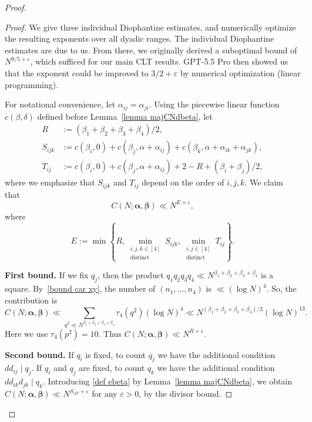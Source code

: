 \documentclass[reqno, 12pt]{amsart}
\theoremstyle{plain}
\theoremstyle{definition}
\theoremstyle{remark}
\newcommand{\bfbeta}{\boldsymbol{\beta}}
\newcommand{\bfalpha}{\boldsymbol{\alpha}}
\begin{document}
\begin{proof}
\begin{proof}
We give three individual Diophantine estimates,
and numerically optimize the resulting exponents over all dyadic ranges.
The individual Diophantine estimates are due to us.
From there, we originally derived a suboptimal bound of $N^{9/5+\varepsilon}$, which sufficed for our main CLT results.
GPT-5.5 Pro then showed us that the exponent could be improved to $3/2+\varepsilon$ by numerical optimization (linear programming).

For notational convenience, let $\alpha_{ij}=\alpha_{ji}$.
Using the piecewise linear function $c(\beta,\delta)$ defined before
Lemma~\ref{lemma majCNdbeta}, let
\begin{align}
R &:= (\beta_1+\beta_2+\beta_3+\beta_4)/2, \\
S_{ijk} &:=
c(\beta_i,0)
+ c(\beta_j,\alpha+\alpha_{ij})
+ c(\beta_k,\alpha+\alpha_{ik}+\alpha_{jk}),
\label{def ebeta} \\
T_{ij} &:=
c(\beta_i,0)
+ c(\beta_j,\alpha+\alpha_{ij})
+ 2-R+(\beta_i+\beta_j)/2,
\end{align}
where we emphasize that $S_{ijk}$ and $T_{ij}$ depend on the order of $i,j,k$.
We claim that
\begin{equation}
C(N;\bfalpha,\bfbeta)\ll N^{E+\varepsilon},
\end{equation}
where
\begin{equation}
E := \min\left\{R,
\min_{\substack{i,j,k\in [4]\\ \mathrm{distinct}}} S_{ijk},
\min_{\substack{i,j\in [4]\\ \mathrm{distinct}}} T_{ij}
\right\}.
\end{equation}

\textbf{First bound.}
If we fix  $q_j$, then the product $q_1q_2q_3q_4\ll N^{\beta_1+\beta_2+\beta_3+\beta_4}$ is a square. By~\eqref{bound car xy}, the number of $(n_1,\ldots,n_4)$ is $\ll (\log N)^4$. So, the contribution is
$$C(N;\bfalpha,\bfbeta)\ll\sum_{q^2\ll N^{\beta_1+\beta_2+\beta_3+\beta_4}}\tau_4(q^2)(\log N)^4
\ll N^{(\beta_1+\beta_2+\beta_3+\beta_4)/2}(\log N)^{13}.$$ Here we use
$\tau_4(p^2)=10.$
Thus $C(N;\bfalpha,\bfbeta)\ll N^{R+\varepsilon}$.

\textbf{Second bound.}
If $q_i$ is fixed, to count $q_j$ we have the additional condition $dd_{ij} \mid q_j$.
If $q_i$ and $q_j$ are  fixed, to count $q_k$ we have the additional condition $dd_{ik}d_{jk} \mid q_k.$ 
Introducing \eqref{def ebeta}
by Lemma~\ref{lemma majCNdbeta},
we obtain
$C(N;\bfalpha,\bfbeta)\ll N^{S_{ijk}+\varepsilon}$
for any $\varepsilon>0$,
by the divisor bound.


\end{proof}
\end{proof}
\end{document}
